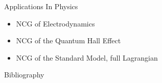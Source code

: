 \documentclass[fleqn]{beamer}
\begin{document}
    \begin{frame}{Applications In Physics}
        \begin{itemize}
            \item NCG of Electrodynamics
            \item NCG of the Quantum Hall Effect
            \item NCG of the Standard Model, full Lagrangian
        \end{itemize}
    \end{frame}

    \begin{frame}{Bibliography}
        \nocite{ncgwalter}
        \nocite{liealgebra}
        \nocite{ncg4pages}
        \nocite{ncgshort}
        \printbibliography
    \end{frame}
\end{document}
